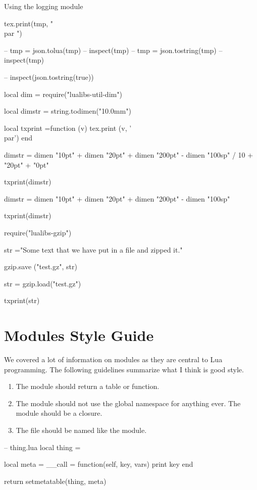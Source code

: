 \begin{texexample}{Using the logging module}{}
\begin{luacode}
tex.print(tmp, " \\par ")


-- tmp = json.tolua(tmp)
-- inspect(tmp)
-- tmp = json.tostring(tmp)
-- inspect(tmp)

-- inspect(json.tostring(true))


local dim =   require("lualibs-util-dim")

local dimstr = string.todimen("10.0mm")

local txprint =function (v)
     				  tex.print (v, '\\par')
               end

dimstr = dimen "10pt" + dimen "20pt" + dimen "200pt" - dimen "100sp" / 10 + "20pt" + "0pt"

txprint(dimstr)

dimstr = dimen "10pt" + dimen "20pt" + dimen "200pt" - dimen "100sp" 

txprint(dimstr)

require("lualibs-gzip") 

str ="Some text that we have put in a file and zipped it."

gzip.save ("test.gz", str)

str  = gzip.load("test.gz")


txprint(str)
\end{luacode}

\end{texexample}


\section{Modules Style Guide}

We covered a lot of information on modules as they are central to Lua programming. The following
guidelines summarize what I think is good style.

\begin{enumerate}
\item The module should return a table or function.

\item The module should not use the global namespace for anything ever. The module should be a closure.

\item The file should be named like the module.
\end{enumerate}

\begin{teX}
-- thing.lua
local thing = { }

local meta = {
  __call = function(self, key, vars)
    print key
  end
}


return setmetatable(thing, meta)
\end{teX}


